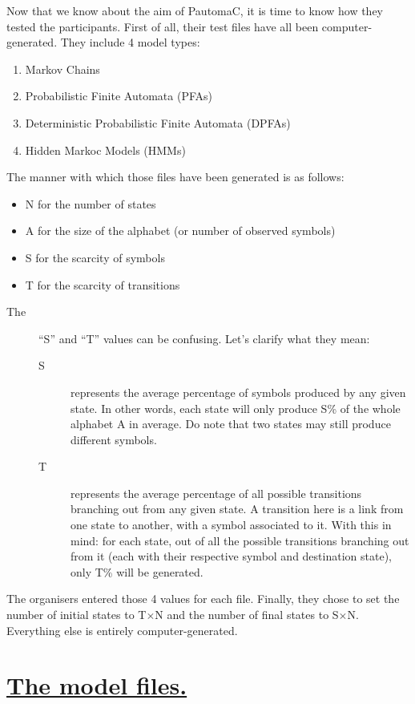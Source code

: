 \quad{}\enskip{}Now that we know about the aim of PautomaC, it is
time to know how they tested the participants. First of all, their
test files have all been computer-generated. They include 4 model
types:
\begin{enumerate}
\item Markov Chains
\item Probabilistic Finite Automata (PFAs)
\item Deterministic Probabilistic Finite Automata (DPFAs)
\item Hidden Markoc Models (HMMs)
\end{enumerate}
The manner with which those files have been generated is as follows:
\begin{itemize}
\item N for the number of states
\item A for the size of the alphabet (or number of observed symbols)
\item S for the scarcity of symbols
\item T for the scarcity of transitions\end{itemize}
\begin{description}
\item [{\textmd{The}}] ``S'' and ``T'' values can be confusing. Let's
clarify what they mean:

\begin{description}
\item [{S}] represents the average percentage of symbols produced by any
given state. In other words, each state will only produce S\% of the
whole alphabet A in average. Do note that two states may still produce
different symbols.
\item [{T}] represents the average percentage of all possible transitions
branching out from any given state. A transition here is a link from
one state to another, with a symbol associated to it. With this in
mind: for each state, out of all the possible transitions branching
out from it (each with their respective symbol and destination state),
only T\% will be generated.
\end{description}
\end{description}
\enskip{}\enskip{}\enskip{}The organisers entered those 4 values
for each file. Finally, they chose to set the number of initial states
to T$\times$N and the number of final states to S$\times$N. Everything
else is entirely computer-generated. 


\part*{{\large{}\uline{The model files.}}}

